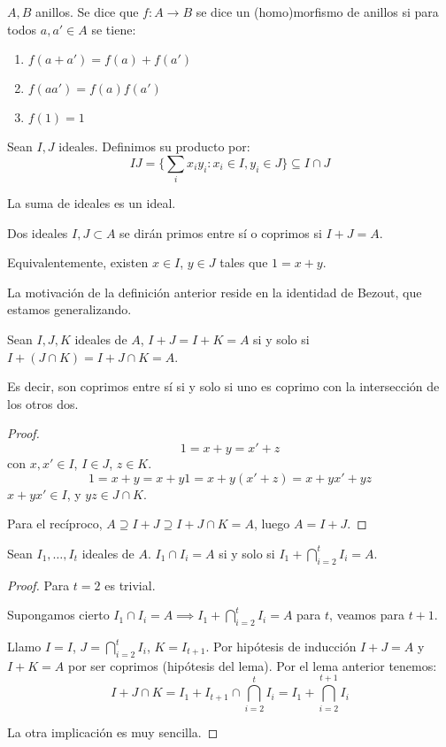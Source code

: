 \begin{df}
  \(A,B\) anillos. Se dice que \(f:A\longrightarrow B\) se dice un
  (homo)morfismo de anillos si para todos \(a,a'\in A\) se tiene:
  \begin{enumerate}
    \item \(f(a+a')=f(a)+f(a')\)
    \item \(f(aa')=f(a)f(a')\)
    \item \(f(1)=1\)
  \end{enumerate}
\end{df}

\begin{df}
  Sean \(I, J\) ideales. Definimos su producto por:
  \[
    IJ=\{\sum_i x_i y_i: x_i\in I, y_i\in J\}\subseteq I\cap J
  \]
\end{df}


La suma de ideales es un ideal.

\begin{df}
  Dos ideales \(I, J\subset A\) se dirán primos entre sí
  o coprimos si \(I+J=A\).

  Equivalentemente, existen \(x\in I\), \(y\in J\) tales que
  \(1=x+y\).
\end{df}

La motivación de la definición anterior reside en la identidad
de Bezout, que estamos generalizando.

\begin{lema}
  Sean \(I, J, K\) ideales de \(A\),
  \(I+J=I+K=A\) si y solo si \(I+(J\cap K)=I+J\cap K=A\).

  Es decir, son coprimos entre sí si y solo si uno es coprimo
  con la intersección de los otros dos.
\end{lema}
\begin{proof}
  \[1=x+y=x'+z\]
  con \(x,x'\in I\), \(I\in J\), \(z\in K\).
  \[1=x+y=x+y1=x+y(x'+z)=x+yx'+yz\]
  \(x+yx'\in I\), y \(yz\in J\cap K\).

  Para el recíproco, \(A\supseteq I+J\supseteq I+J\cap K=A\),
  luego \(A=I+J\).
\end{proof}

\begin{lema}
  Sean \(I_1,\ldots, I_t\) ideales de \(A\).
  \(I_1\cap I_i=A\) si y solo si
  \(I_1+\bigcap_{i=2}^t I_i=A\).
\end{lema}
\begin{proof}
  Para \(t=2\) es trivial.

  Supongamos cierto \(I_1\cap I_i=A\implies
  I_1+\bigcap_{i=2}^t I_i=A\) para \(t\), veamos para \(t+1\).

  Llamo \(I=I\), \(J=\bigcap_{i=2}^t I_i\), \(K=I_{t+1}\).
  Por hipótesis de inducción \(I+J=A\) y \(I+K=A\) por ser coprimos
  (hipótesis del lema). Por el lema anterior tenemos:
  \[
    I+J\cap K=I_1+I_{t+1}\cap \bigcap_{i=2}^{t}
    I_i =I_1 + \bigcap_{i=2}^{t+1} I_i
  \]

  La otra implicación es muy sencilla.
\end{proof}

